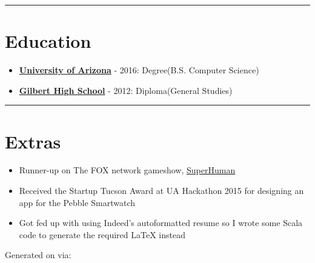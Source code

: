 \documentclass{article}
\begin{document}
\noindent\rule{\linewidth}{1pt}

\raggedright{\section*{Education}}

\begin{itemize}
\item \href{https://www.cs.arizona.edu/}{\textbf{University of Arizona}} - 2016: Degree(B.S. Computer Science)
\item \href{https://www.gilbertschools.net/gilberthigh}{\textbf{Gilbert High School}} - 2012: Diploma(General Studies)
\end{itemize}

\noindent\rule{\linewidth}{1pt}

\raggedright{\section*{Extras}}

\begin{itemize}
\item Runner-up on The FOX network gameshow, \href{https://www.youtube.com/watch?v=t65mzlOCDF8}{SuperHuman}
\item Received the Startup Tucson Award at UA Hackathon 2015 for designing an app for the Pebble Smartwatch
\item Got fed up with using Indeed's autoformatted resume so I wrote some Scala code to generate the required LaTeX instead
\end{itemize}

\vspace*{\fill}
Generated on  via:

\end{document}
